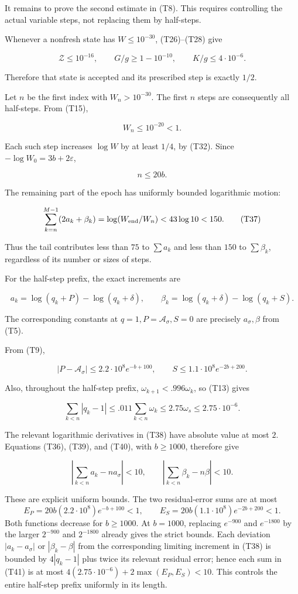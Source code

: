 It remains to prove the second estimate in (T8). This requires controlling the actual variable steps, not replacing them by half-steps.

Whenever a nonfresh state has \(W\le10^{-30}\), (T26)–(T28) give

\[
\mathcal Z\le10^{-16},\qquad
G/g\ge1-10^{-10},\qquad
K/g\le4\cdot10^{-6}.
\]

Therefore that state is accepted and its prescribed step is exactly \(1/2\).

Let \(n\) be the first index with \(W_n>10^{-30}\). The first \(n\) steps are consequently all half-steps. From (T15),

\[
W_n\le10^{-20}<1.
\]

Each such step increases \(\log W\) by at least \(1/4\), by (T32). Since
\(-\log W_0=3b+2\varepsilon\),

\[
n\le20b.
\tag{T36}
\]

The remaining part of the epoch has uniformly bounded logarithmic motion:

\[
\sum_{k=n}^{M-1}(2a_k+\beta_k)
=\log(W_{\rm end}/W_n)
<43\log10<150.
\tag{T37}
\]

Thus the tail contributes less than \(75\) to \(\sum a_k\) and less than \(150\) to \(\sum\beta_k\), regardless of its number or sizes of steps.

For the half-step prefix, the exact increments are

\[
a_k=\log(q_k+P)-\log(q_k+\delta),
\qquad
\beta_k=\log(q_k+\delta)-\log(q_k+S).
\tag{T38}
\]

The corresponding constants at \(q=1,P=\mathcal A_\sigma,S=0\) are precisely \(a_\sigma,\beta\) from (T5).

From (T9),

\[
|P-\mathcal A_\sigma|
\le2.2\cdot10^8e^{-b+100},
\qquad
S\le1.1\cdot10^8e^{-2b+200}.
\tag{T39}
\]

Also, throughout the half-step prefix,
\(\omega_{k+1}<.996\omega_k\), so (T13) gives

\[
\sum_{k<n}|q_k-1|
\le .011\sum_{k<n}\omega_k
\le2.75\omega_s
\le2.75\cdot10^{-6}.
\tag{T40}
\]

The relevant logarithmic derivatives in (T38) have absolute value at most \(2\). Equations (T36), (T39), and (T40), with \(b\ge1000\), therefore give

\[
\left|\sum_{k<n}a_k-na_\sigma\right|<10,
\qquad
\left|\sum_{k<n}\beta_k-n\beta\right|<10.
\tag{T41}
\]

These are explicit uniform bounds. The two residual-error sums are at most
\[
 E_P=20b(2.2\cdot10^8)e^{-b+100}<1,\qquad
 E_S=20b(1.1\cdot10^8)e^{-2b+200}<1.
\]
Both functions decrease for $b\ge1000$. At $b=1000$, replacing $e^{-900}$ and $e^{-1800}$ by the larger $2^{-900}$ and $2^{-1800}$ already gives the strict bounds. Each deviation $|a_k-a_\sigma|$ or $|\beta_k-\beta|$ from the corresponding limiting increment in (T38) is bounded by $4|q_k-1|$ plus twice its relevant residual error; hence each sum in (T41) is at most $4(2.75\cdot10^{-6})+2\max(E_P,E_S)<10$. This controls the entire half-step prefix uniformly in its length.

